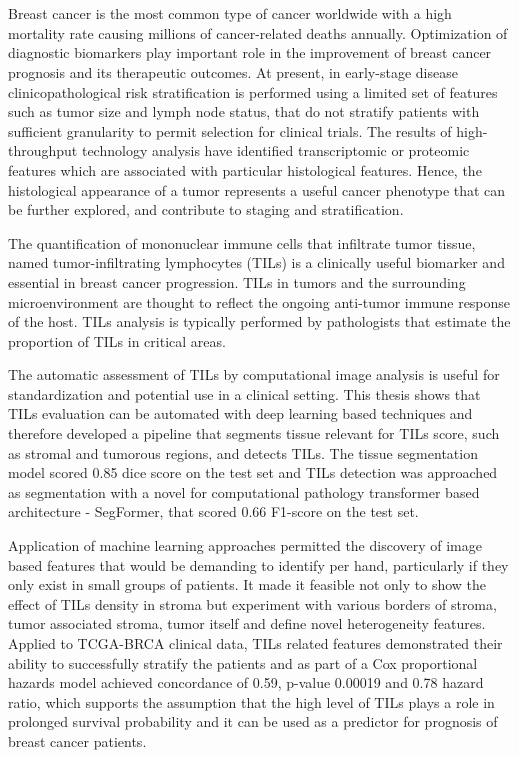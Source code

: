 \chapter{\abstractname}

Breast cancer is the most common type of cancer worldwide with a high mortality rate causing millions of cancer-related deaths annually.
Optimization of diagnostic biomarkers play important role in the improvement of breast cancer prognosis and its therapeutic outcomes.
At present, in early-stage disease clinicopathological risk stratification
is performed using a limited set of features such as tumor size and lymph node status, that do not stratify patients with sufficient granularity to permit selection for clinical trials. 
The results of high-throughput technology analysis have identified transcriptomic or proteomic features which are associated with particular histological features. 
Hence, the histological appearance of a tumor represents a useful cancer phenotype that can be further explored, and contribute to staging and stratification.

The quantification of mononuclear immune cells that infiltrate tumor tissue, named tumor-infiltrating lymphocytes (TILs) is a clinically useful biomarker and essential in breast cancer progression. TILs in tumors and the surrounding microenvironment are thought to reflect the ongoing anti-tumor immune response of the host.
TILs analysis is typically performed by pathologists that estimate the proportion of TILs in critical areas.

The automatic assessment of TILs by computational image analysis is useful for standardization and potential use in a clinical setting.
This thesis shows that TILs evaluation can be automated with deep learning based techniques and therefore developed a pipeline that segments tissue relevant for TILs score, such as stromal and tumorous regions, and detects TILs. The tissue segmentation model scored 0.85 dice score on the test set and TILs detection was approached as segmentation with a novel for computational pathology transformer based architecture - SegFormer, that scored 0.66 F1-score on the test set.

Application of machine learning approaches permitted the discovery of image based features that would be demanding to identify per hand, particularly if they only exist in small groups of patients. It made it feasible not only to show the effect of TILs density in stroma but experiment with various borders of stroma, tumor associated stroma, tumor itself and define novel heterogeneity features.
Applied to TCGA-BRCA clinical data, TILs related features demonstrated their ability to successfully stratify the patients and as part of a Cox proportional hazards model achieved concordance of 0.59, p-value 0.00019 and 0.78 hazard ratio, which supports the assumption that the high level of TILs plays a role in prolonged survival probability and it can be used as a predictor for prognosis of breast cancer patients.



